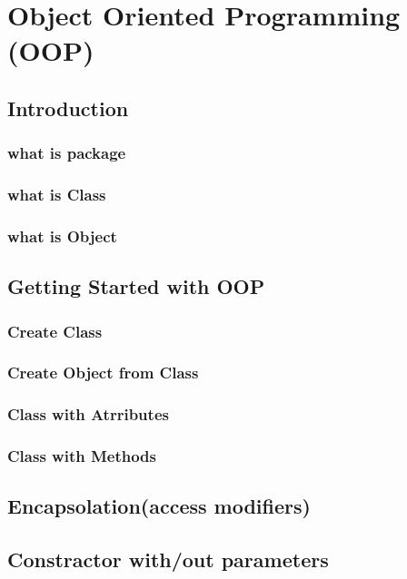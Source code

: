 \documentclass[openany]{book}
\begin{document}
\pagestyle{fancy}
%
\chapter{Object Oriented Programming (OOP)}
\thispagestyle{empty}
\section{Introduction}
\subsection{what is package}
\subsection{what is Class}
\subsection{what is Object}
\section{Getting Started with OOP}
\subsection{Create Class}
\subsection{Create Object from Class}
\subsection{Class with Atrributes}
\subsection{Class with Methods}
\section{Encapsolation(access modifiers)}
\section{Constractor with/out parameters}
\end{document}
